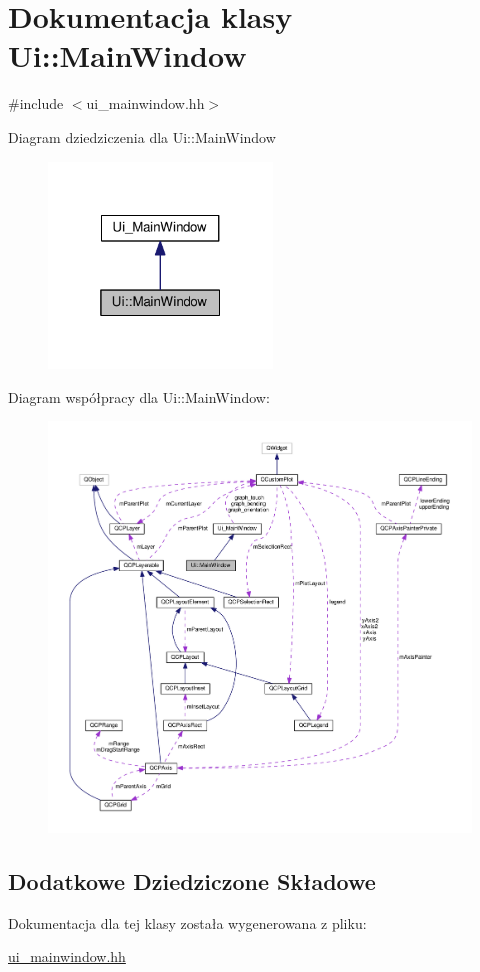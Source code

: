 \hypertarget{class_ui_1_1_main_window}{}\section{Dokumentacja klasy Ui\+:\+:Main\+Window}
\label{class_ui_1_1_main_window}


{\ttfamily \#include $<$ui\+\_\+mainwindow.\+hh$>$}



Diagram dziedziczenia dla Ui\+:\+:Main\+Window\nopagebreak
\begin{figure}[H]
\begin{center}
\leavevmode
\includegraphics[width=169pt]{class_ui_1_1_main_window__inherit__graph}
\end{center}
\end{figure}


Diagram współpracy dla Ui\+:\+:Main\+Window\+:\nopagebreak
\begin{figure}[H]
\begin{center}
\leavevmode
\includegraphics[width=350pt]{class_ui_1_1_main_window__coll__graph}
\end{center}
\end{figure}
\subsection*{Dodatkowe Dziedziczone Składowe}


Dokumentacja dla tej klasy została wygenerowana z pliku\+:\begin{DoxyCompactItemize}
\item 
\hyperlink{ui__mainwindow_8hh}{ui\+\_\+mainwindow.\+hh}\end{DoxyCompactItemize}
